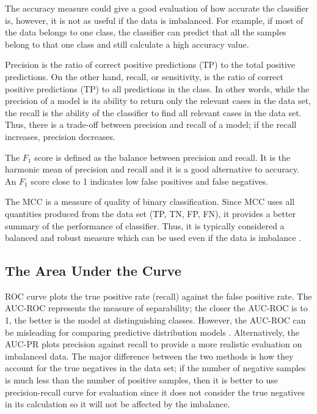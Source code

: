 The accuracy measure could give a good evaluation of how accurate the classifier is, however, it is not as useful if the data is imbalanced.
For example, if most of the data belongs to one class, the classifier can predict that all the samples belong to that one class and still calculate a high accuracy value.

Precision is the ratio of correct positive predictions (TP) to the total positive predictions.
On the other hand, recall, or sensitivity, is the ratio of correct positive predictions (TP) to all predictions in the class.
In other words, while the precision of a model is its ability to return only the relevant cases in the data set, the recall is the ability of the classifier to find all relevant cases in the data set.
Thus, there is a trade-off between precision and recall of a model; if the recall increases, precision decreases.

The $F_{1}$ score is defined as the balance between precision and recall.
It is the harmonic mean of precision and recall and it is a good alternative to accuracy.
An $F_{1}$ score close to 1 indicates low false positives and false negatives.

The \ac{MCC} is a measure of quality of binary classification.
Since \ac{MCC} uses all quantities produced from the data set (TP, TN, FP, FN), it provides a better summary of the performance of classifier.
Thus, it is typically considered a balanced and robust measure which can be used even if the data is imbalance \cite{boughorbel_optimal_2017}.

\subsection{The Area Under the Curve}

\ac{ROC} curve plots the true positive rate (recall) against the false positive rate.
The \ac{AUC-ROC} represents the measure of separability; the closer the AUC-ROC is to 1, the better is the model at distinguishing classes.
However, the AUC-ROC can be misleading for comparing predictive distribution models \cite{lobo_auc:_2008}.
Alternatively, the \ac{AUC-PR} plots precision against recall to provide a more realistic evaluation on imbalanced data.
The major difference between the two methods is how they account for the true negatives in the data set; if the number of negative samples is much less than the number of positive samples, then it is better to use precision-recall curve for evaluation since it does not consider the true negatives in its calculation so it will not be affected by the imbalance.
